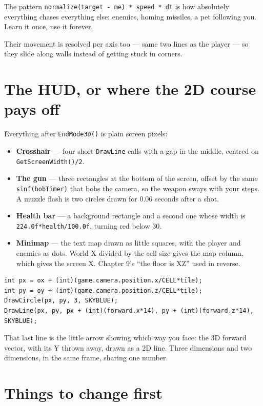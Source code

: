 The pattern \lstinline|normalize(target - me) * speed * dt| is how absolutely
everything chases everything else: enemies, homing missiles, a pet following you.
Learn it once, use it forever.

Their movement is resolved per axis too --- same two lines as the player --- so
they slide along walls instead of getting stuck in corners.

\section{The HUD, or where the 2D course pays off}

Everything after \lstinline|EndMode3D()| is plain screen pixels:

\begin{itemize}[leftmargin=*,itemsep=3pt]
  \item \textbf{Crosshair} --- four short \lstinline|DrawLine| calls with a gap
        in the middle, centred on \lstinline|GetScreenWidth()/2|.
  \item \textbf{The gun} --- three rectangles at the bottom of the screen, offset
        by the same \lstinline|sinf(bobTimer)| that bobs the camera, so the
        weapon sways with your steps. A muzzle flash is two circles drawn for
        0.06 seconds after a shot.
  \item \textbf{Health bar} --- a background rectangle and a second one whose
        width is \lstinline|224.0f*health/100.0f|, turning red below 30.
  \item \textbf{Minimap} --- the text map drawn as little squares, with the
        player and enemies as dots. World X divided by the cell size gives the
        map column, which gives the screen X. Chapter 9's ``the floor is XZ''
        used in reverse.
\end{itemize}

\begin{lstlisting}
int px = ox + (int)(game.camera.position.x/CELL*tile);
int py = oy + (int)(game.camera.position.z/CELL*tile);
DrawCircle(px, py, 3, SKYBLUE);
DrawLine(px, py, px + (int)(forward.x*14), py + (int)(forward.z*14), SKYBLUE);
\end{lstlisting}

That last line is the little arrow showing which way you face: the 3D forward
vector, with its Y thrown away, drawn as a 2D line. Three dimensions and two
dimensions, in the same frame, sharing one number.

\section{Things to change first}

